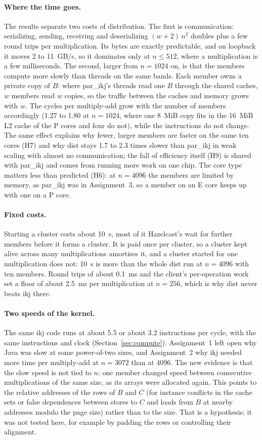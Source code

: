 \documentclass[11pt,a4paper]{article}
\begin{document}
\paragraph{Where the time goes.} The results separate two costs of
distribution. The first is communication: serializing, sending, receiving and
deserializing $(w+2)\,n^2$ doubles plus a few round trips per multiplication.
Its bytes are exactly predictable, and on loopback it moves 2 to 11~GB/s, so it
dominates only at $n\le512$, where a multiplication is a few milliseconds. The
second, larger from $n=1024$ on, is that the members compute more slowly than
threads on the same bands. Each member owns a private copy of $B$: where
par\_ikj's threads read one $B$ through the shared caches, $w$ members read $w$
copies, so the traffic between the caches and memory grows with $w$. The cycles
per multiply-add grow with the number of members accordingly (1.27 to 1.80 at
$n=1024$, where one 8~MiB copy fits in the 16~MiB L2 cache of the P cores and
four do not), while the instructions do not change. The same effect explains
why fewer, larger members are faster on the same ten cores (H7) and why dist
stays 1.7 to 2.3 times slower than par\_ikj in weak scaling with almost no
communication; the fall of efficiency itself (H9) is shared with par\_ikj and
comes from running more work on one chip. The core
type matters less than predicted (H6): at $n=4096$ the members are limited by
memory, as par\_ikj was in Assignment~3, so a member on an E core keeps up with
one on a P core.

\paragraph{Fixed costs.} Starting a cluster costs about 10~s, most of it
Hazelcast's wait for further members before it forms a cluster. It is paid once
per cluster, so a cluster kept alive across many multiplications amortises it,
and a cluster started for one multiplication does not: 10~s is more than the
whole dist run at $n=4096$ with ten members. Round trips of about 0.1~ms and
the client's per-operation work set a floor of about 2.5~ms per multiplication
at $n=256$, which is why dist never beats ikj there.

\paragraph{Two speeds of the kernel.} The same ikj code runs at about 5.5 or
about 3.2 instructions per cycle, with the same instructions and clock
(Section~\ref{sec:compute}). Assignment~1 left open why Java was slow at some
power-of-two sizes, and Assignment~2 why ikj needed more time per multiply-add
at $n=3072$ than at 4096. The new evidence is that the slow speed is not tied
to $n$: one member changed speed between consecutive multiplications of the
same size, as its arrays were allocated again. This points to the relative
addresses of the rows of $B$ and $C$ (for instance conflicts in the cache sets
or false dependences between stores to $C$ and loads from $B$ at nearby
addresses modulo the page size) rather than to the size. That is a hypothesis;
it was not tested here, for example by padding the rows or controlling their
alignment.
\end{document}
